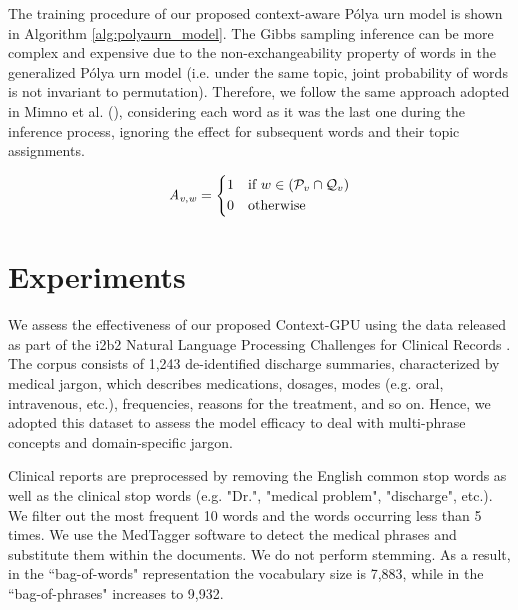 \documentclass[letterpaper]{article}
\begin{document}
The training procedure of our proposed context-aware P\'{o}lya urn model is shown in Algorithm \ref{alg:polyaurn_model}. %
The Gibbs sampling inference can be more complex and expensive due to the non-exchangeability property of words in the generalized P\'{o}lya urn model (i.e. under the same topic, joint probability of words is not invariant to permutation). Therefore, we follow the same approach adopted in Mimno et al. (\citeyear{Mimno11}), considering each word as it was the last one during the inference process, ignoring the effect for subsequent words and their topic assignments.

\begin{equation}
  \mathit{A_{v,w}}=
  \begin{dcases}
      1 & \text{if  }  w \in (\mathcal{P}_{v} \cap \mathcal{Q}_{v})  \\
      0               & \text{otherwise}
  \end{dcases}
\label{eq:matrixA}
\end{equation}







\section{Experiments}

We assess the effectiveness of our proposed Context-GPU using the data released as part of the i2b2 Natural Language Processing Challenges for Clinical Records \cite{Uzuner10}. The corpus consists of 1,243 de-identified discharge summaries, characterized by medical jargon, which describes medications, dosages, modes (e.g. oral, intravenous, etc.), frequencies, reasons for the treatment, and so on. Hence, we adopted this dataset to assess the model efficacy to deal with multi-phrase concepts and domain-specific jargon.

Clinical reports are preprocessed by removing the English common stop words as well as the clinical stop words (e.g. "Dr.", "medical problem", "discharge", etc.). We filter out the most frequent 10 words and the words occurring less than 5 times. We use the MedTagger software to detect the medical phrases and substitute them within the documents. We do not perform stemming. As a result, in the ``bag-of-words" representation the vocabulary size is 7,883, while in the ``bag-of-phrases" increases to 9,932.
\end{document}
